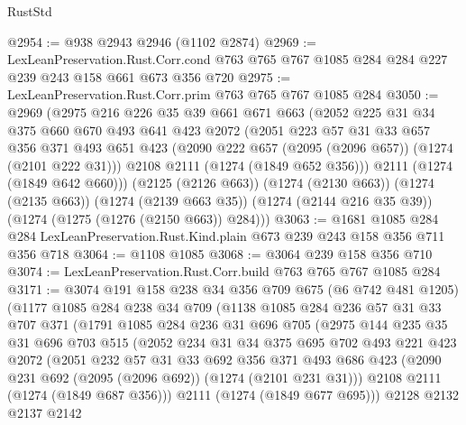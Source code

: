 \begin{lexlean}{RustStd}
\begin{coremodule}
@2954 := @938 @2943 @2946 (@1102 @2874)
@2969 := LexLeanPreservation.Rust.Corr.cond
    @763
    @765
    @767
    @1085
    @284
    @284
    @227
    @239
    @243
    @158
    @661
    @673
    @356
    @720
@2975 := LexLeanPreservation.Rust.Corr.prim @763 @765 @767 @1085 @284
@3050 := @2969
    (@2975
      @216
      @226
      @35
      @39
      @661
      @671
      @663
      (@2052
        @225
        @31
        @34
        @375
        @660
        @670
        @493
        @641
        @423
        @2072
        (@2051
          @223
          @57
          @31
          @33
          @657
          @356
          @371
          @493
          @651
          @423
          (@2090 @222 @657 (@2095 (@2096 @657)) (@1274 (@2101 @222 @31)))
          @2108
          @2111
          (@1274 (@1849 @652 @356)))
        @2111
        (@1274 (@1849 @642 @660)))
      (@2125 (@2126 @663))
      (@1274 (@2130 @663))
      (@1274 (@2135 @663))
      (@1274 (@2139 @663 @35))
      (@1274 (@2144 @216 @35 @39))
      (@1274 (@1275 (@1276 (@2150 @663)) @284)))
@3063 := @1681
    @1085
    @284
    @284
    LexLeanPreservation.Rust.Kind.plain
    @673
    @239
    @243
    @158
    @356
    @711
    @356
    @718
@3064 := @1108 @1085
@3068 := @3064 @239 @158 @356 @710
@3074 := LexLeanPreservation.Rust.Corr.build @763 @765 @767 @1085 @284
@3171 := @3074
    @191
    @158
    @238
    @34
    @356
    @709
    @675
    (@6 @742 @481 @1205)
    (@1177
      @1085
      @284
      @238
      @34
      @709
      (@1138
        @1085
        @284
        @236
        @57
        @31
        @33
        @707
        @371
        (@1791
          @1085
          @284
          @236
          @31
          @696
          @705
          (@2975
            @144
            @235
            @35
            @31
            @696
            @703
            @515
            (@2052
              @234
              @31
              @34
              @375
              @695
              @702
              @493
              @221
              @423
              @2072
              (@2051
                @232
                @57
                @31
                @33
                @692
                @356
                @371
                @493
                @686
                @423
                (@2090 @231 @692 (@2095 (@2096 @692)) (@1274 (@2101 @231 @31)))
                @2108
                @2111
                (@1274 (@1849 @687 @356)))
              @2111
              (@1274 (@1849 @677 @695)))
            @2128
            @2132
            @2137
            @2142

\end{coremodule}
\end{lexlean}
